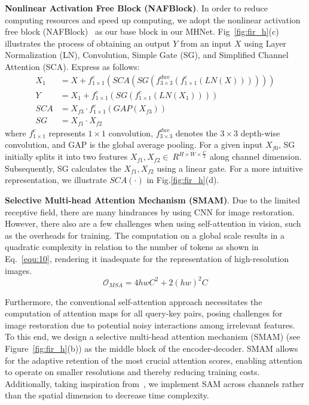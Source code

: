 \documentclass[lettersize,journal]{IEEEtran}
\begin{document}
\noindent\textbf{Nonlinear Activation Free Block (NAFBlock)}. 
In order to reduce computing resources and speed up computing, we adopt the nonlinear activation free block (NAFBlock)~\cite{chen2022simple} as our base block in our MHNet. Fig~\ref{fig:fir_h}(c) illustrates the process of obtaining an output $Y$ from an input $X$ using Layer Normalization (LN), Convolution, Simple Gate (SG), and Simplified Channel Attention (SCA). Express as follows:
\begin{equation}
\begin{aligned}
	\label{equ:0xnaf}
	X_1 &= X +f_{1 \times 1}^c(SCA(SG(f_{3 \times 3}^{dwc} (f_{1 \times 1}^c(LN(X)))))) 
 \\
 Y &= X_1 +f_{1 \times 1}^c(SG(f_{1 \times 1}^c(LN(X_1))))
    \\
    SCA &= X_{f3} \cdot f_{1 \times 1}^c( GAP(X_{f3}))
    \\
    SG &= X_{f1} \cdot X_{f2} 
\end{aligned}
\end{equation}
where $f_{1 \times 1}^c$ represents $1 \times 1$ convolution, $f_{3 \times 3}^{dwc}$ denotes the $3 \times 3$ depth-wise convolution, and GAP is the global average pooling. For a given input $X_{f0}$, SG initially splits it into two features $X_{f1}, X_{f2} \in \  R^{H \times W \times \frac{C}{2}}$  along channel dimension. Subsequently, SG calculates the $X_{f1}, X_{f2}$ using a linear gate.  For a more intuitive representation, we illustrate $SCA(\cdot)$ in Fig.\ref{fig:fir_h}(d). 




\noindent\textbf{Selective Multi-head Attention Mechanism (SMAM)}. Due to the limited receptive field, there are many hindrances by using CNN for image restoration. However, there also are a few challenges when using self-attention in vision, such as the overheads for training. The computation on a global scale results in a quadratic complexity in relation to the number of tokens as shown in Eq.~\ref{equ:10}, rendering it inadequate for the representation of high-resolution images. 
\begin{equation}
	\label{equ:10}
    \mathcal{O}_{MSA} = 4hwC^2 + 2(hw)^2C  
\end{equation}

Furthermore, the conventional self-attention approach necessitates the computation of attention maps for all query-key pairs, posing challenges for image restoration due to potential noisy interactions among irrelevant features.
To this end, we design  a  selective multi-head attention mechanism (SMAM) (see Figure~\ref{fig:fir_h}(b))  as the middle block of the encoder-decoder. SMAM allows for the adaptive retention of the most crucial attention scores, enabling attention to operate on smaller resolutions and thereby reducing training costs. Additionally, taking inspiration from~\cite{Zamir2021Restormer}, we implement SAM across channels rather than the spatial dimension to decrease time complexity.
\end{document}
